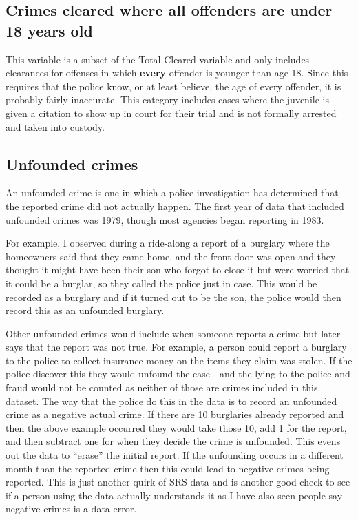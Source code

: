 \documentclass[
]{krantz}
\begin{document}
\subsection{Crimes cleared where all offenders are under 18
years
old}\label{crimes-cleared-where-all-offenders-are-under-18-years-old}

This variable is a subset of the Total Cleared variable and
only includes clearances for offenses in which
\textbf{every} offender is younger than age 18. Since this
requires that the police know, or at least believe, the age
of every offender, it is probably fairly inaccurate. This
category includes cases where the juvenile is given a
citation to show up in court for their trial and is not
formally arrested and taken into custody.

\subsection{Unfounded crimes}\label{unfounded}

An unfounded crime is one in which a police investigation
has determined that the reported crime did not actually
happen. The first year of data that included unfounded
crimes was 1979, though most agencies began reporting in
1983.

For example, I observed during a ride-along a report of a
burglary where the homeowners said that they came home, and
the front door was open and they thought it might have been
their son who forgot to close it but were worried that it
could be a burglar, so they called the police just in case.
This would be recorded as a burglary and if it turned out to
be the son, the police would then record this as an
unfounded burglary.

Other unfounded crimes would include when someone reports a
crime but later says that the report was not true. For
example, a person could report a burglary to the police to
collect insurance money on the items they claim was stolen.
If the police discover this they would unfound the case -
and the lying to the police and fraud would not be counted
as neither of those are crimes included in this dataset. The
way that the police do this in the data is to record an
unfounded crime as a negative actual crime. If there are 10
burglaries already reported and then the above example
occurred they would take those 10, add 1 for the report, and
then subtract one for when they decide the crime is
unfounded. This evens out the data to ``erase'' the initial
report. If the unfounding occurs in a different month than
the reported crime then this could lead to negative crimes
being reported. This is just another quirk of SRS data and
is another good check to see if a person using the data
actually understands it as I have also seen people say
negative crimes is a data error.
\end{document}

